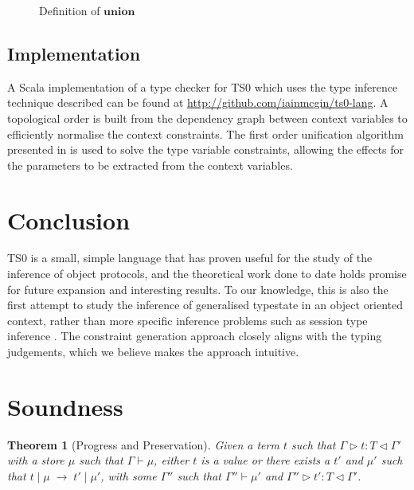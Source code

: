 \documentclass[preprint]{sigplanconf}
\newtheorem{thm}{Theorem}
\newcommand{\typerule}[4]{#1 \triangleright #2 : #3 \triangleleft #4}
\newcommand{\oprule}[4]{#1 \mid #2\;\longrightarrow\;#3 \mid #4}
\begin{document}
\begin{figure}

\caption{\label{fig:overlaydefn} Definition of $\mathbf{union}$}
\end{figure}


\subsection{Implementation}

A Scala implementation of a type checker for TS0 which uses the type inference
technique described can be found at \url{http://github.com/iainmcgin/ts0-lang}.
A topological order is built from the dependency graph between context variables
to efficiently normalise the context constraints. The first order unification 
algorithm presented in \cite{Martelli1982} is used to solve the type variable 
constraints, allowing the effects for the parameters to be extracted from
the context variables.

\section{Conclusion}

TS0 is a small, simple language that has proven useful
for the study of the inference of object protocols, and the theoretical work
done to date holds promise for future expansion and interesting results. 
To our knowledge, this is also the first attempt to study the inference
of generalised typestate in an object oriented context, rather than
more specific inference problems such as session type inference
\cite{Collingbourne2010}. The
constraint generation approach closely aligns with the typing judgements,
which we believe makes the approach intuitive.

\appendix

\section{Soundness}
\label{app:soundness}



\begin{thm}[Progress and Preservation]
\label{thm:soundness}
Given a term $t$ such that $\typerule{\Gamma}{t}{T}{\Gamma'}$
with a store $\mu$ such that $\Gamma \vdash \mu$, either $t$ is a value or 
there exists a $t'$ and $\mu'$ such that
$\oprule{t}{\mu}{t'}{\mu'}$, with some $\Gamma''$ such that
$\Gamma'' \vdash \mu'$ and $\typerule{\Gamma''}{t'}{T}{\Gamma'}$.
\end{thm}
\end{document}

